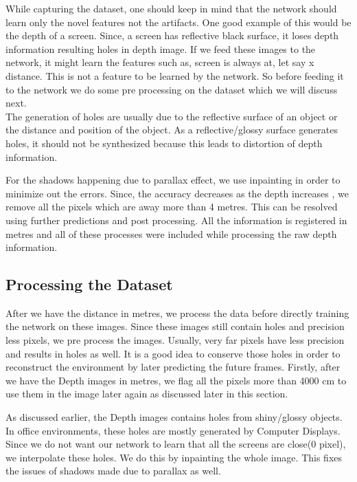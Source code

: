 While capturing the dataset, one should keep in mind that the network should learn only the novel features not the artifacts. One good example of this would be the depth of a screen. Since, a screen has reflective black surface, it loses depth information resulting holes in depth image.  If we feed these images to the network, it might learn the features such as, screen is always at, let say x distance. This is not a feature to be learned by the network. So before feeding it to the network we do some pre processing on the dataset which we will discuss next.\\

The generation of holes are usually due to the reflective surface of an object or the distance and position of the object\cite{geomar41830}. As a reflective/glossy surface generates holes, it should not be synthesized because this leads to distortion of depth information.

For the shadows happening due to parallax effect, we use inpainting \cite{zamir2018taskonomy} in order to minimize out the errors. Since, the accuracy decreases as the depth increases \cite{deptherror}, we remove all the pixels which are away more than 4 metres. This can be resolved using further predictions and post processing. All the information is registered in metres and  all of these processes were included while processing the raw depth information.\\

\subsection{Processing the Dataset}

After we have the distance in metres, we process the data before directly training the network on these images. Since these images still contain holes and precision less pixels, we pre process the images. Usually, very far pixels have less precision and results in holes as well\cite{deptherror}. It is a good idea to conserve those holes in order to reconstruct the environment by later predicting the future frames. Firstly, after we have the Depth images in metres, we flag  all the pixels more than 4000 cm to use them in the image later again as discussed later in this section.

As discussed earlier, the Depth images contains holes from shiny/glossy objects\cite{shiny}. In office environments, these holes are mostly generated by Computer Displays. Since we do not want our network to learn that all the screens are close(0 pixel), we interpolate these holes. We do this by inpainting the whole image. This fixes the issues of shadows made due to parallax as well. \\

